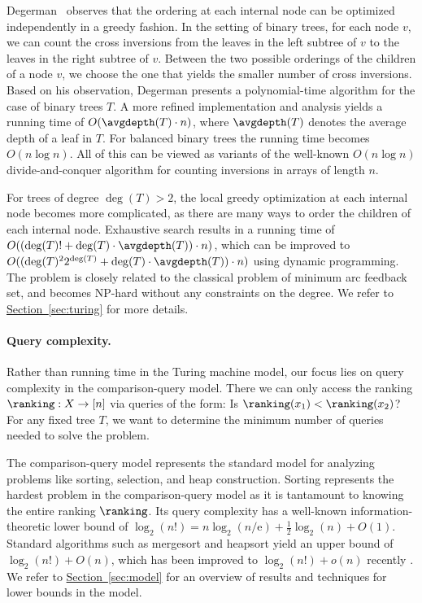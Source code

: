 \documentclass[11pt]{article}
\numberwithin{equation}{section}
\theoremstyle{definition}
\theoremstyle{plain}
\newcommand{\eee}{\mathrm e}
\newcommand{\expref}[2]{\hyperref[#2]{#1~\ref{#2}}}
\begin{document}
Degerman~\cite{Degerman1982} observes that the ordering at each internal node can be optimized %
%
independently in a greedy fashion. In the setting of binary trees, for each node $v$, we can count the cross inversions from the leaves in the left subtree of $v$ to the leaves in the right subtree of $v$. Between the two possible orderings of the children of a node $v$, we choose the one that yields the smaller number of cross inversions. 
Based on his observation, Degerman presents a polynomial-time algorithm for the case of binary trees $T$. A more refined implementation and analysis yields a running time of $O(\avgdepth(T) \cdot n)$, where $\avgdepth(T)$ denotes the average depth of a leaf in $T$. For balanced binary trees the running time becomes $O(n \log n)$. All of this can be viewed as variants of the well-known $O(n \log n)$ divide-and-conquer algorithm for counting inversions in arrays of length $n$.

For trees of degree $\deg(T) > 2$, the local greedy optimization at each internal node becomes more complicated, as there are many ways to order the children of each internal node. Exhaustive search results in a running time of $O((\deg(T)! + \deg(T) \cdot \avgdepth(T)) \cdot n)$, which can be improved to $O((\deg(T)^2 2^{\deg(T)} + \deg(T) \cdot \avgdepth(T)) \cdot n)$ using dynamic programming. The problem is closely related to the classical problem of minimum arc feedback set, and becomes NP-hard without any constraints on the degree. We refer to \expref{Section}{sec:turing} for more details.

\paragraph{Query complexity.}
Rather than running time in the Turing machine model, our focus lies on query complexity in the comparison-query model. There we can only access the ranking $\ranking: X \to [n]$ via queries of the form: Is $\ranking(x_1) < \ranking(x_2)$? For any fixed tree $T$, we want to determine the minimum number of queries needed to solve the problem. 

The comparison-query model represents the standard model for analyzing problems like sorting, selection, and heap construction. Sorting represents the hardest problem in the comparison-query model as it is tantamount to knowing the entire ranking $\ranking$. Its query complexity has a well-known information-theoretic lower bound of $\log_2(n!) = n \log_2(n/\eee) + \frac{1}{2} \log_2(n) + O(1)$. Standard algorithms such as mergesort and heapsort yield an upper bound of $\log_2(n!) + O(n)$, which has been improved to $\log_2(n!) + o(n)$ recently \cite{Sergeev2020}.
We refer to \expref{Section}{sec:model} for an overview of results and techniques for lower bounds in the model.
\end{document}
